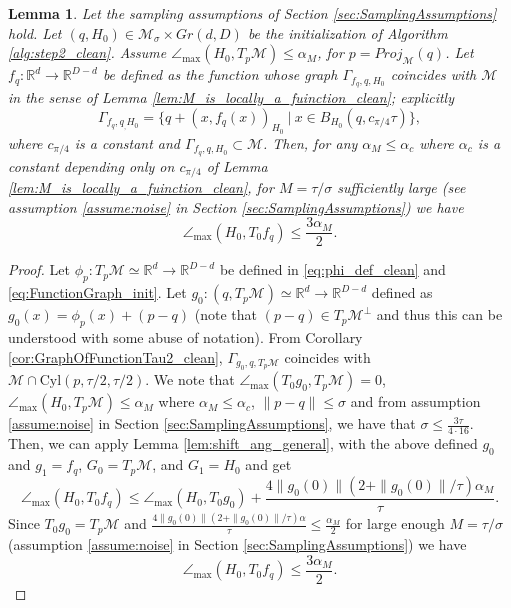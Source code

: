 \documentclass[12pt]{article}
\newtheorem{Lemma}[Theorem]{Lemma}
\theoremstyle{remark}
\newcommand{\RR}{\mathbb{R}}
\newcommand{\MM}{\mathcal{M}}
\newcommand{\maxangle}{\angle_{\max}}
\begin{document}
\begin{appendices}
\begin{Lemma}\label{lem:Tf_Tftilde_Init}
	Let the sampling assumptions of Section \ref{sec:SamplingAssumptions} hold.
	Let $(q, H_0)\in \MM_\sigma\times Gr(d,D)$ be the initialization of Algorithm \ref{alg:step2_clean}. Assume $\maxangle (H_0, T_p\MM) \leq \alpha_M$, for $p = Proj_\MM(q)$.
	Let $ f_q:\RR^d\to\RR^{D-d} $ be defined as the function whose graph $ \Gamma_{f_q, q, H_0} $ coincides with $ \MM $ in the sense of Lemma \ref{lem:M_is_locally_a_fuinction_clean}; explicitly 
	\[
	\Gamma_{f_q, q_, H_0} = \{q + (x, f_q(x))_{H_0} ~|~ x\in B_{H_0}(q, c_{\pi/4}\tau)\}
	,\]
	where $c_{\pi/4}$ is a constant and $\Gamma_{f_q, q, H_0} \subset \MM$.
	Then, for any $\alpha_M \leq \alpha_c$ where $\alpha_c$ is a constant depending only on $c_{\pi/4}$ of Lemma \ref{lem:M_is_locally_a_fuinction_clean}, for $M=\tau/\sigma$ sufficiently large (see assumption \ref{assume:noise} in Section \ref{sec:SamplingAssumptions}) we have 
	\[
	\maxangle(H_0, T_0 f_q) 
	\leq  \frac{3 \alpha_M}{2}
	.\]
\end{Lemma}
\begin{proof}
    Let $\phi_p: T_p\MM \simeq \RR^d \rightarrow \RR^{D-d}$ be defined in \eqref{eq:phi_def_clean} and \eqref{eq:FunctionGraph_init}. Let $g_0:(q,T_p\MM) \simeq \RR^d \to \RR^{D-d}$ defined as $g_0(x) = \phi_p(x) + (p - q)$ (note that $ (p-q) \in T_p \MM^\perp$ and thus this can be understood with some abuse of notation). From Corollary \ref{cor:GraphOfFunctionTau2_clean}, $\Gamma_{g_0, q, T_p\MM}$ coincides with $\MM \cap \mathrm{Cyl}(p,\tau/2, \tau/2)$.
    We note that $\maxangle (T_0g_0, T_p\MM)=0$,  $\maxangle(H_0, T_p\MM)\leq \alpha_M$ where $\alpha_M \leq \alpha_c$, $\|p-q\| \leq \sigma$ and from assumption \ref{assume:noise} in Section \ref{sec:SamplingAssumptions}, we have that $\sigma \leq \frac{3\tau}{4 \cdot 16}$.  
    Then, we can apply Lemma \ref{lem:shift_ang_general}, with the above defined $g_0$ and $g_1 = f_q$, $G_0 = T_p\MM$, and $G_1 = H_0$ and get
    \[
    \maxangle (H_0, T_0f_q) \leq \maxangle(H_0, T_0g_0)  + \frac{4\|g_0(0)\|\left(2+\|g_0(0)\|/\tau\right)\alpha_M}{\tau}
    .\]
Since $T_0g_0 = T_p\MM$ and $\frac{4\|g_0(0)\|\left(2+\|g_0(0)\|/\tau\right)\alpha}{\tau} \leq \frac{\alpha_M}{2}$ for large enough $M=\tau/\sigma$ (assumption \ref{assume:noise} in Section \ref{sec:SamplingAssumptions}) we have 
\[
    \maxangle (H_0, T_0f_q) \leq \frac{3\alpha_M}{2}.
\]



\end{proof}
\end{appendices}
\end{document}
